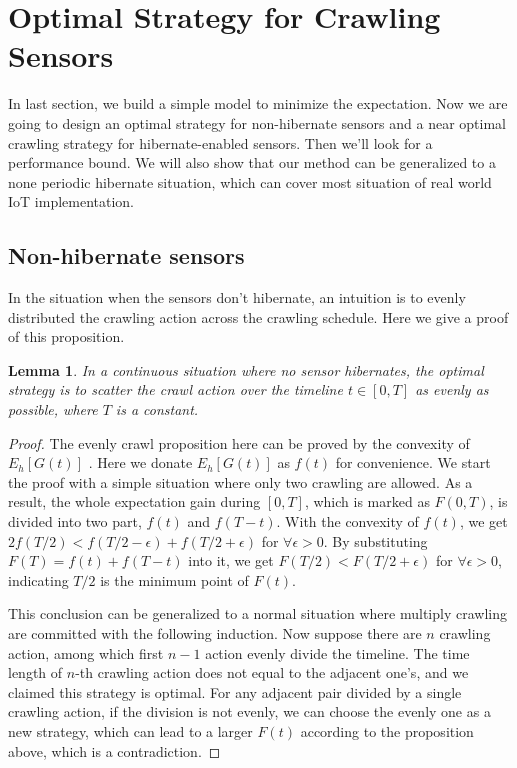 \documentclass[conference]{IEEEtran}
\newtheorem{lemma}{Lemma}
\begin{document}
\section{Optimal Strategy for Crawling Sensors}

In last section, we build a simple model to minimize the expectation. Now we are going to design an optimal strategy for non-hibernate sensors and a near optimal crawling strategy for hibernate-enabled sensors. Then we'll look for a performance bound. We will also show that our method can be generalized to a none periodic hibernate situation, which can cover most situation of real world IoT implementation. 

\subsection{Non-hibernate sensors}

In the situation when the sensors don't hibernate, an intuition is to evenly distributed the crawling action across the crawling schedule. Here we give a proof of this proposition.

\begin{lemma}
\label{evenly}
In a continuous situation where no sensor hibernates, the optimal strategy is to scatter the crawl action over the timeline $t\in [0, T]$ as evenly as possible, where $T$ is a constant.
\end{lemma}

\begin{proof}
The evenly crawl proposition here can be proved by the convexity of $E_h[G(t)]$ \cite{boyd2004convex}. Here we donate $E_h[G(t)]$ as $f(t)$ for convenience. 
We start the proof with a simple situation where only two crawling are allowed. 
As a result, the whole expectation gain during $[0,T]$, which is marked as $F(0, T)$, is divided into two part, $f(t)$ and $f(T-t)$. With the convexity of $f(t)$, we get $2f(T/2)<f(T/2-\epsilon)+f(T/2+\epsilon)$ for $\forall{\epsilon>0}$. By substituting $F(T)=f(t)+f(T-t)$ into it, we get $F(T/2)<F(T/2+\epsilon)$ for $\forall{\epsilon>0}$, indicating $T/2$ is the minimum point of $F(t)$.


This conclusion can be generalized to a normal situation where multiply crawling are committed with the following induction. 
Now suppose there are $n$ crawling action, among which first $n-1$ action evenly divide the timeline. The time length of $n$-th crawling action does not equal to the adjacent one's, and we claimed this strategy is optimal. For any adjacent pair divided by a single crawling action, if the division is not evenly, we can choose the evenly one as a new strategy, which can lead to a larger $F(t)$ according to the proposition above, which is a contradiction.
\end{proof}
\end{document}
